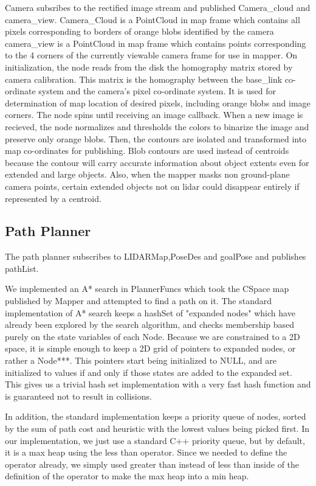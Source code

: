 \documentclass{article}
\begin{document}
Camera subsribes to the rectified image stream and published Camera_cloud and camera_view.
Camera_Cloud is a PointCloud in map frame which contains all pixels corresponding to borders of orange blobs identified by the camera
camera_view is a PointCloud in map frame which contains points corresponding to the 4 corners of the currently viewable camera frame for use in mapper.
On initialization, the node reads from the disk the homography matrix stored by camera calibration.  This matrix is the homography between the base_link co-ordinate system and the camera's pixel co-ordinate system.  It is used for determination of map location of desired pixels, including orange blobs and image corners.
The node spins until receiving an image callback.  When a new image is recieved, the node normalizes and thresholds the colors to binarize the image and preserve only orange blobs.  Then, the contours are isolated and transformed into map co-ordinates for publishing.  Blob contours are used instead of centroids because the contour will carry accurate information about object extents even for extended and large objects.  Also, when the mapper masks non ground-plane camera points, certain extended objects not on lidar could disappear entirely if represented by a centroid.

\subsection{Path Planner}

The path planner subscribes to LIDARMap,PoseDes and goalPose and publishes pathList.

We implemented an A* search in PlannerFuncs which took the CSpace map published by Mapper and attempted to find a path on it.
The standard implementation of A* search keeps a hashSet of "expanded nodes" which have already been explored by the search algorithm, and checks membership based purely on the state variables of each Node.  
Because we are constrained to a 2D space, it is simple enough to keep a 2D grid of pointers to expanded nodes, or rather a Node***. 
This pointers start being initialized to NULL, and are initialized to values if and only if those states are added to the expanded set.
This gives us a trivial hash set implementation with a very fast hash function and is guaranteed not to result in collisions.

In addition, the standard implementation keeps a priority queue of nodes, sorted by the sum of path cost and heuristic with the lowest values being picked first.
In our implementation, we just use a standard C++ priority queue, but by default, it is a max heap using the less than operator.
Since we needed to define the operator already, we simply used greater than instead of less than inside of the definition of the operator to make the max heap into a min heap.
\end{document}
